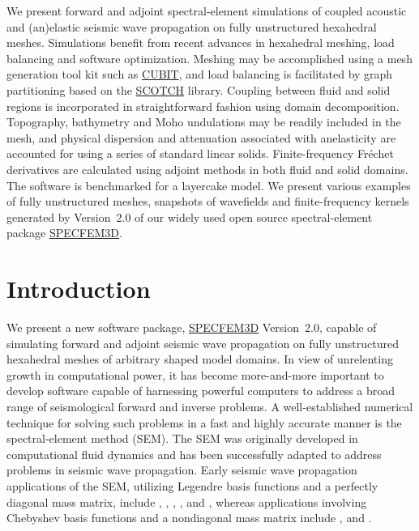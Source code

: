 \documentclass[referee,extra]{gji}
\renewcommand{\cite}[1]{\citet{#1}}
\begin{document}

\begin{summary}
We present forward and adjoint
spectral-element simulations of coupled acoustic and (an)elastic seismic
wave propagation on fully unstructured hexahedral meshes.
Simulations benefit from recent advances in hexahedral meshing, load balancing
and software optimization.
Meshing may be accomplished using a mesh generation tool kit such as \href{http://cubit.sandia.gov}{CUBIT},
and load balancing is facilitated by graph partitioning based on the \href{http://www.labri.fr/perso/pelegrin/scotch/}{SCOTCH} library.
Coupling between fluid and solid regions is incorporated in straightforward fashion using domain decomposition.
Topography, bathymetry and Moho undulations may be readily included in the mesh,
and physical dispersion and attenuation associated with anelasticity are accounted for using a series
of standard linear solids.
Finite-frequency Fr\'echet derivatives are calculated using adjoint methods in both fluid and solid domains.
The software is benchmarked for a layercake model.
We present various examples of fully unstructured meshes, snapshots of wavefields and finite-frequency kernels
generated by Version~2.0 of our widely used open source spectral-element package \href{http://www.geodynamics.org/cig/software/specfem3d}{SPECFEM3D}.
 \end{summary}


\section{Introduction}\label{sec:Introduction}
We present a new software package, \href{http://www.geodynamics.org/cig/software/specfem3d}{SPECFEM3D} Version~2.0,
capable of simulating forward and adjoint seismic wave propagation on fully unstructured hexahedral meshes of
arbitrary shaped model domains.
In view of unrelenting  growth in computational power,
it has become more-and-more important to develop software capable of
harnessing powerful computers to address a broad range of seismological forward and inverse problems.
A well-established numerical technique for solving such problems in a fast and highly accurate manner
is the spectral-element method (SEM).
The SEM was originally developed in computational fluid dynamics \citep{Pat84,MaPa89}
and has been successfully adapted to address problems in seismic wave propagation.
Early seismic wave propagation applications of the SEM, utilizing Legendre basis functions and a
perfectly diagonal mass matrix, include \cite{CoJoTo93}, \cite{Kom97},
\cite{FaMaPaQu97}, \cite{CaGa97}, \cite{KoVi98} and \cite{KoTr99},
whereas applications involving Chebyshev basis functions and a nondiagonal mass matrix
include \cite{SePr94}, \cite{PrCaSe94} and \cite{SePrPr95}.
\end{document}
